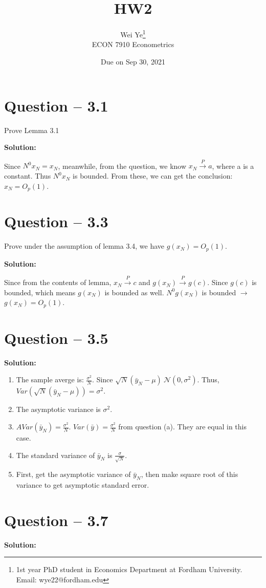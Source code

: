 \documentclass[11pt]{article} %
\title{HW2}
\author{Wei Ye\footnote{ 1st year PhD student in Economics Department at Fordham University. Email: wye22@fordham.edu}
    \\ ECON 7910 Econometrics}
\date{Due on Sep 30, 2021}
\begin{document}
	\maketitle

\section{Question -- 3.1}
Prove Lemma 3.1

\textbf{Solution:}

Since $N^0x_N=x_N$, meanwhile, from the question, we know $x_N \xrightarrow{P} a$, where a is a constant. Thus $N^0x_N$ is bounded. 
From these, we can get the conclusion: $x_N=O_p(1)$.

\section{Question -- 3.3}
Prove under the assumption of lemma 3.4, we have $g(x_N)=O_p(1)$.

\textbf{Solution:}

Since from the contents of lemma, $x_N \xrightarrow{P} c$ and $g(x_N)\xrightarrow{P} g(c)$. Since
$g(c)$ is bounded, which means $g(x_N)$ is bounded as well. $N^0 g(x_N)$ is bounded $\longrightarrow$ $g(x_N)=O_p(1)$.

\section{Question -- 3.5}
\textbf{Solution:}

\begin{enumerate}
    \item The sample averge is: $\frac{\sigma^2}{N}$. Since $\sqrt{N}(\bar{y}_N-\mu) ~ \mathcal{N}(0,\sigma^2)$. Thus, 
    $Var(\sqrt{N}(\bar{y}_N-\mu))=\sigma^2$. 
    \item The asymptotic variance is $\sigma^2$.
    \item $AVar(\bar{y}_N)=\frac{\sigma^2}{N}$. $Var(\bar{y})=\frac{\sigma^2}{N}$ from question (a). They are equal in this case.
    \item The standard variance of $\bar{y}_N$ is $\frac{\sigma}{\sqrt{N}}$.
    \item First, get the asymptotic variance of $\bar{y}_N$, then make square root of this variance to get 
    asymptotic standard error.
\end{enumerate}


\section{Question -- 3.7}
\textbf{Solution:}
\end{document}
